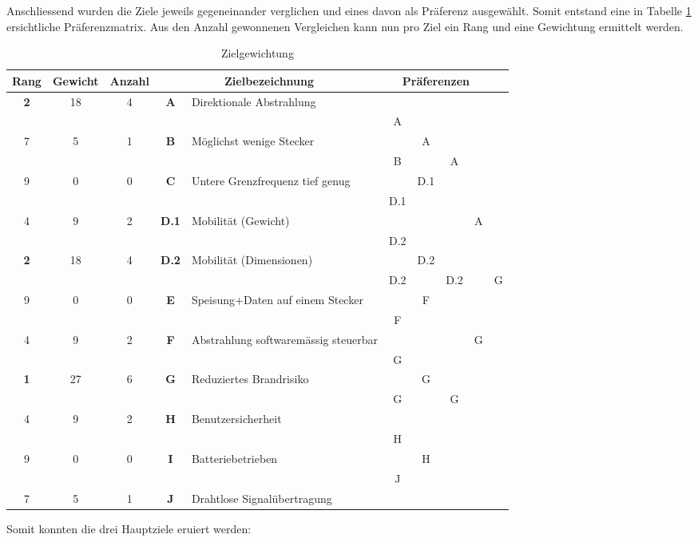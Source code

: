 Anschliessend wurden die Ziele jeweils gegeneinander verglichen und eines davon als Präferenz ausgewählt. Somit entstand eine in Tabelle \ref{tab:aimweights} ersichtliche Präferenzmatrix. Aus den Anzahl gewonnenen Vergleichen kann nun pro Ziel ein Rang und eine Gewichtung ermittelt werden.
\begin{table}[!ht]
	\centering
	\begin{tabularx}{\textwidth}{cccclccccc}
		\toprule
		\textbf{Rang} & \textbf{Gewicht} & \textbf{Anzahl} & \multicolumn{2}{c}{\textbf{Zielbezeichnung}} & \multicolumn{4}{c}{\textbf{Präferenzen}} \\ \midrule
		\textbf{2} & 18 & 4 & \textbf{A} & Direktionale Abstrahlung & ~ & ~ & ~ & ~ & ~ \\ 
		\textbf{} & ~ & ~ & ~ & ~ & A & ~ & ~ & ~ & ~ \\ 
		7 & 5 & 1 & \textbf{B} & Möglichst wenige Stecker & ~ & A & ~ & ~ & ~ \\ 
		\textbf{} & ~ & ~ & ~ & ~ & B & ~ & A & ~ & ~ \\ 
		9 & 0 & 0 & \textbf{C} & Untere Grenzfrequenz tief genug & ~ & D.1 & ~ & ~ & ~ \\ 
		\textbf{} & ~ & ~ & ~ & ~ & D.1 & ~ & ~ & ~ & ~ \\ 
		4 & 9 & 2 & \textbf{D.1} & Mobilität (Gewicht) & ~ & ~ & ~ & A & ~ \\ 
		\textbf{} & ~ & ~ & ~ & ~ & D.2 & ~ & ~ & ~ & ~ \\ 
		\textbf{2} & 18 & 4 & \textbf{D.2} & Mobilität (Dimensionen) & ~ & D.2 & ~ & ~ & ~ \\ 
		\textbf{} & ~ & ~ & ~ & ~ & D.2 & ~ & D.2 & ~ & G \\ 
		9 & 0 & 0 & \textbf{E} & Speisung+Daten auf einem Stecker & ~ & F & ~ & ~ & ~ \\ 
		\textbf{} & ~ & ~ & ~ & ~ & F & ~ & ~ & ~ & ~ \\ 
		4 & 9 & 2 & \textbf{F} & Abstrahlung softwaremässig steuerbar & ~ & ~ & ~ & G & ~ \\ 
		\textbf{} & ~ & ~ & ~ & ~ & G & ~ & ~ & ~ & ~ \\ 
		\textbf{1} & 27 & 6 & \textbf{G} & Reduziertes Brandrisiko & ~ & G & ~ & ~ & ~ \\ 
		\textbf{} & ~ & ~ & ~ & ~ & G & ~ & G & ~ & ~ \\ 
		4 & 9 & 2 & \textbf{H} & Benutzersicherheit & ~ & ~ & ~ & ~ & ~ \\ 
		\textbf{} & ~ & ~ & ~ & ~ & H & ~ & ~ & ~ & ~ \\ 
		9 & 0 & 0 & \textbf{I} &  Batteriebetrieben & ~ & H & ~ & ~ & ~ \\ 
		\textbf{} & ~ & ~ & ~ & ~ & J & ~ & ~ & ~ & ~ \\ 
		7 & 5 & 1 & \textbf{J} &  Drahtlose Signalübertragung & ~ & ~ & ~ & ~ & ~ \\ 
		\bottomrule
	\end{tabularx}
	\caption{Zielgewichtung}
	\label{tab:aimweights}
\end{table}
Somit konnten die drei Hauptziele eruiert werden:
